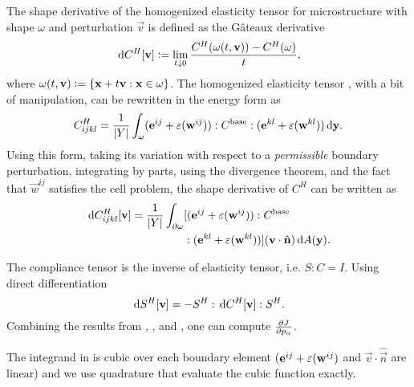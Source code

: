 \documentclass[twocolumn,10pt]{article}
\begin{document}
 The shape derivative of
the homogenized elasticity tensor for microstructure with shape
$\omega$ and perturbation $\vec{v}$ is defined as the G\^ateaux
derivative \cite{zolesio2001shapes}
\begin{equation}
  \, \mathrm{d} C^H[\mathbf v] \vcentcolon= \lim_{t\downarrow 0} \frac{C^H(\omega(t,\mathbf v))-C^H(\omega)}{t},
\end{equation}
where $\omega(t,\mathbf v) \vcentcolon= \{\mathbf x+t\mathbf v : \mathbf x \in \omega\}$. The
homogenized elasticity tensor , with a bit of
manipulation, can be rewritten in the energy form as
\begin{equation}
  \label{eqn:EhEnergy}
  C^H_{ijkl} = \frac{1}{|Y|} \int_\omega (\mathbf e^{ij} +
  \varepsilon(\mathbf w^{ij})) : C^\text{base} : (\mathbf e^{kl} +
  \varepsilon(\mathbf w^{kl})) \, \mathrm{d} \mathbf y.
\end{equation}
Using this form, taking its variation with respect to a
\emph{permissible} boundary perturbation, integrating by parts, using
the divergence theorem, and the fact that $\vec{w}^{ij}$ satisfies the
cell problem, the shape derivative of $C^H$ can be written as
\begin{align}
  \label{eqn:elastShapeDer}
  \, \mathrm{d} C^H_{ijkl}[\mathbf v] =
  \frac{1}{|Y|} \int_{\partial \omega} &[(\mathbf e^{ij} + \varepsilon(\mathbf w^{ij})) : C^\text{base}\\
    &: (\mathbf e^{kl} + \varepsilon(\mathbf w^{kl}))] (\mathbf v \cdot \hat{\mathbf n}) \, \mathrm{d}A(\mathbf y).\notag
\end{align}

 The compliance tensor is
the inverse of elasticity tensor, i.e. $S:C=I$. Using direct
differentiation
\begin{equation}
  \label{eqn:compShapeDer}
  \, \mathrm{d} S^H[\mathbf v] = -S^H : \, \mathrm{d} C^H[\mathbf v] : S^H.
\end{equation}
Combining the results from ,
, and , one can compute $\frac{\partial J}{\partial p_\alpha}$.

 The integrand in  is
cubic over each boundary element ($\mathbf e^{ij} +
\varepsilon(\mathbf w^{ij})$ and $\vec{v}\cdot\hat{\vec{n}}$ are linear) and
we use quadrature that evaluate the cubic function exactly.



\end{document}
